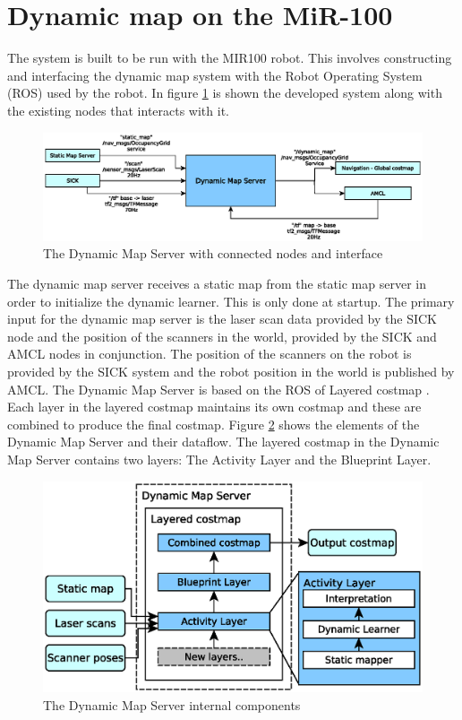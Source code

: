 \section{Dynamic map on the MiR-100}

The system is built to be run with the MIR100 robot. This involves constructing and interfacing the dynamic map system with the Robot Operating System (ROS) used by the robot. In figure \ref{fig:mir_interface} is shown the developed system along with the existing nodes that interacts with it. 

\begin{figure}[htbp]
	\centering
	\includegraphics[width=1\linewidth]{chapters/cost_interpretation/figures/dynamic_map_mir_interface.eps}
	\caption{The Dynamic Map Server with connected nodes and interface}
	\label{fig:mir_interface}
\end{figure}

The dynamic map server receives a static map from the static map server in order to initialize the dynamic learner. This is only done at startup. The primary input for the dynamic map server is the laser scan data provided by the SICK node and the position of the scanners in the world, provided by the SICK and AMCL nodes in conjunction. The position of the scanners on the robot is provided by the SICK system and the robot position in the world is published by AMCL. 
The Dynamic Map Server is based on the ROS of Layered costmap \cite{lu2014layered}. Each layer in the layered costmap maintains its own costmap and these are combined to produce the final costmap. Figure \ref{fig:dynamic_map_server_internal} shows the elements of the Dynamic Map Server and their dataflow. The layered costmap in the Dynamic Map Server contains two layers: The Activity Layer and the Blueprint Layer. 

\begin{figure}[htbp]
	\centering
	\includegraphics[scale=0.7]{chapters/cost_interpretation/figures/implementation_overview.eps}
	\caption{The Dynamic Map Server internal components}
	\label{fig:dynamic_map_server_internal}
\end{figure}

